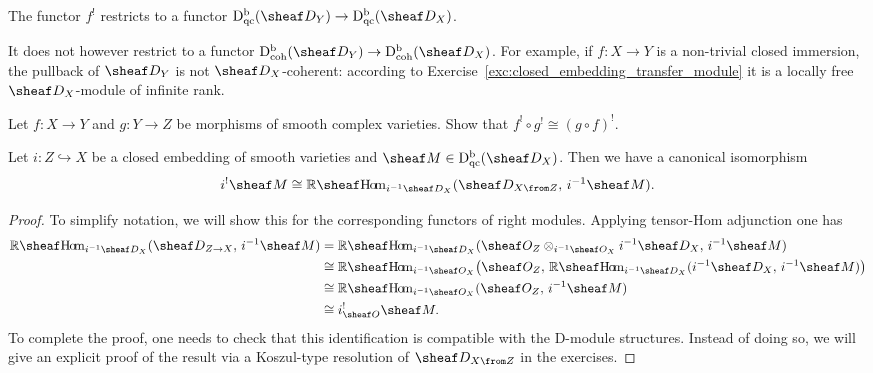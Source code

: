 \documentclass[number-in-sections,a4paper]{notes}
\begin{document}
\begin{Lemma}
    The functor $f^!$ restricts to a functor $\catDbDModqc Y \to \catDbDModqc X$.
\end{Lemma}

\begin{Remark}
    It does not however restrict to a functor $\catDbDModcoh Y \to \catDbDModcoh X$.
    For example, if $f\colon X \to Y$ is a non-trivial closed immersion, the pullback of $\sD_Y$ is not $\sD_X$-coherent: according to Exercise~\ref{exc:closed_embedding_transfer_module} it is a locally free $\sD_X$-module of infinite rank.
\end{Remark}

\begin{Exercise}
    Let $f\colon X \to Y$ and $g\colon Y \to Z$ be morphisms of smooth complex varieties.
    Show that $f^! \circ g^! \cong (g \circ f)^!$.
\end{Exercise}


\begin{Proposition}\label{prop:i^!-for-closed-immersion}
    Let $i\colon Z \hookrightarrow X$ be a closed embedding of smooth varieties and $\sheaf M \in \catDbDModqc{X}$.
    Then we have a canonical isomorphism
    \[
        i^!\sheaf M \cong \RsheafHom_{i^{-1}\sD_X}(\sD_{X \from Z},\, i^{-1}\sheaf M).
    \]
\end{Proposition}

\begin{proof}
    To simplify notation, we will show this for the corresponding functors of right modules.
    Applying tensor-Hom adjunction one has
    \begin{align*}
        \sheafRHom_{i^{-1}\sD_X}(\sD_{Z \to X},\, i^{-1}\sheaf M) & =
        \sheafRHom_{i^{-1}\sD_X}(\sO_Z \otimes_{i^{-1}\sO_X} i^{-1}\sD_X,\, i^{-1}\sheaf M) \\ &\cong
        \sheafRHom_{i^{-1}\sO_X}\bigl(\sO_Z,\, \sheafRHom_{i^{-1}\sD_X}( i^{-1}\sD_X,\, i^{-1}\sheaf M)\bigr) \\ &\cong
        \sheafRHom_{i^{-1}\sO_X}(\sO_Z,\, i^{-1}\sheaf M) \\&\cong
        i_{\sO}^!\sheaf M.
    \end{align*}
    To complete the proof, one needs to check that this identification is compatible with the D-module structures.
    Instead of doing so, we will give an explicit proof of the result via a Koszul-type resolution of $\sD_{X \from Z}$ in the exercises.
\end{proof}
\end{document}
